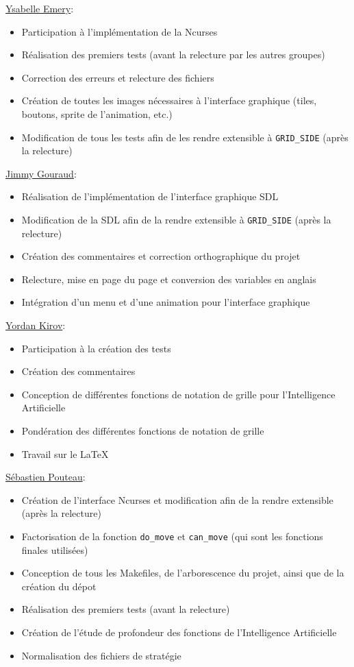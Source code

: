 \documentclass[a4paper]{article}
\begin{document}
 \vspace{0.2cm}
 \noindent
 \underline{Ysabelle Emery}:
 \begin{itemize}
 \item Participation à l'implémentation de la Ncurses
 \item Réalisation des premiers tests (avant la relecture par les autres groupes)
 \item Correction des erreurs et relecture des fichiers
 \item Création de toutes les images nécessaires à l'interface graphique (tiles, boutons, sprite de l'animation, etc.)
 \item Modification de tous les tests afin de les rendre extensible à \texttt{GRID\_SIDE} (après la relecture)
 \end{itemize}
 \vspace{0.2cm}
 \underline{Jimmy Gouraud}:
 \begin{itemize}
 \item Réalisation de l'implémentation de l'interface graphique SDL
 \item Modification de la SDL afin de la rendre extensible à \texttt{GRID\_SIDE} (après la relecture)
 \item Création des commentaires et correction orthographique du projet
 \item Relecture, mise en page du page et conversion des variables en anglais
 \item Intégration d'un menu et d'une animation pour l'interface graphique
 \end{itemize}
 \vspace{0.2cm}
 \underline{Yordan Kirov}:
 \begin{itemize}
 \item Participation à la création des tests
 \item Création des commentaires
 \item Conception de différentes fonctions de notation de grille pour l'Intelligence Artificielle
 \item Pondération des différentes fonctions de notation de grille
 \item Travail sur le \LaTeX
 \end{itemize}
 \vspace{0.2cm}
 \underline{Sébastien Pouteau}:
 \begin{itemize}
 \item Création de l'interface Ncurses et modification afin de la rendre extensible (après la relecture)
 \item Factorisation de la fonction \texttt{do\_move} et \texttt{can\_move} (qui sont les fonctions finales utilisées)
 \item Conception de tous les Makefiles, de l'arborescence du projet, ainsi que de la création du dépot
 \item Réalisation des premiers tests (avant la relecture)
 \item Création de l'étude de profondeur des fonctions de l'Intelligence Artificielle
 \item Normalisation des fichiers de stratégie
 \end{itemize}
 \newpage
\end{document}
